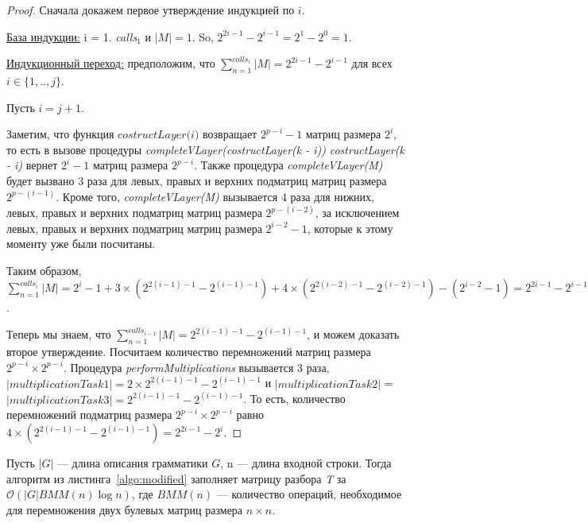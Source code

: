 \begin{proof}

Сначала докажем первое утверждение индукцией по $i$.

\underline{База индукции:} i = 1. \textit{calls$_{1}$} и $|M| = 1$. So, $2^{2i - 1} - 2^{i - 1} = 2^1 - 2^0 = 1$.

\underline{Индукционный переход:} предположим, что $\sum_{n=1}^{calls_i}{|M|} = 2^{2i - 1} - 2^{i - 1}$ для всех $i \in \{ 1, .., j\}$.

Пусть $i = j + 1$.

Заметим, что функция $\textit{costructLayer(i)}$ возвращает $2^{p - i} - 1$ матриц размера $2^i$, то есть в вызове процедуры \textit{completeVLayer(costructLayer(k - i))}  \textit{costructLayer(k - i)} вернет $2^i - 1$ матриц размера $2^{p - i}$.
Также процедура \textit{completeVLayer(M)} будет вызвано 3 раза для левых, правых и верхних подматриц матриц размера $2^{p - (i - 1)}$. Кроме того, \textit{completeVLayer(M)} вызывается 4 раза для нижних, левых, правых и верхних подматриц матриц размера $2^{p - (i - 2)}$, за исключением левых, правых и верхних подматриц матриц размера $2^{i - 2} - 1$, которые к этому моменту уже были посчитаны.

Таким образом, $\sum_{n=1}^{calls_i}{|M|} = 2^{i} - 1 + 3 \times (2^{2(i - 1) - 1} - 2^{(i - 1) - 1}) + 4 \times (2^{2(i - 2) - 1} - 2^{(i - 2) - 1}) - (2^{i - 2} - 1) = 2^{2i - 1} - 2^{i - 1}$.

Теперь мы знаем, что $\sum_{n=1}^{calls_{i-1}}{|M|} = 2^{2(i - 1) - 1} - 2^{(i - 1) - 1}$, и можем доказать второе утверждение. Посчитаем количество перемножений матриц размера $2^{p - i} \times 2^{p - i}$.
Процедура \textit{performMultiplications} вызывается 3 раза, $|multiplicationTask1| = 2 \times 2^{2(i - 1) - 1} - 2^{(i - 1) - 1}$ и $|multiplicationTask2|$ = $|multiplicationTask3| = 2^{2(i - 1) - 1} - 2^{(i - 1) - 1}$. То есть, количество перемножений подматриц размера $2^{p - i} \times 2^{p - i}$ равно $ 4 \times (2^{2(i - 1) - 1} - 2^{(i - 1) - 1}) = 2^{2i - 1} - 2^{i}$.
\end{proof}

\begin{theorem}
Пусть $|G|$ --- длина описания грамматики $G$, n --- длина входной строки. Тогда алгоритм из листинга~\ref{algo:modified} заполняет матрицу разбора \textit{T} за $\mathcal{O}(|G|BMM(n)\log{n})$, где $BMM(n)$ --- количество операций, необходимое для перемножения двух булевых матриц размера $n \times n$.
\end{theorem}


